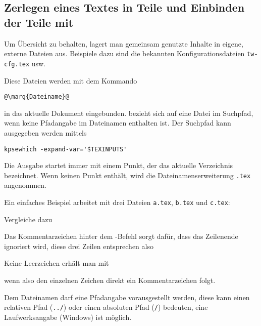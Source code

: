 \subsection[Zerlegen und Einbinden von Textteilen]{Zerlegen eines Textes in
  Teile und Einbinden der Teile mit }

Um Übersicht zu behalten, lagert man gemeinsam genutzte Inhalte in
eigene, externe Dateien aus. Beispiele dazu sind die bekannten
Konfigurationsdateien \texttt{tw-cfg.tex} usw.

Diese Dateien werden mit dem Kommando
\begin{lstlisting}
@\marg{Dateiname}@
\end{lstlisting}
in das aktuelle Dokument eingebunden.  bezieht sich
auf eine Datei im Suchpfad, wenn keine Pfadangabe im Dateinamen
enthalten ist. Der Suchpfad kann ausgegeben werden mittels
\begin{lstlisting}
kpsewhich -expand-var='$TEXINPUTS'
\end{lstlisting}
Die Ausgabe startet immer mit einem Punkt, der das aktuelle Verzeichnis
bezeichnet. Wenn  keinen Punkt enthält, wird die
Dateinamenserweiterung \texttt{.tex} angenommen.

Ein einfaches Beispiel arbeitet mit drei Dateien \texttt{a.tex},
\texttt{b.tex} und \texttt{c.tex}:





Vergleiche dazu

%
%


Das Kommentarzeichen hinter dem -Befehl sorgt dafür, dass
das Zeilenende ignoriert wird, diese drei Zeilen entsprechen also



Keine Leerzeichen erhält man mit



wenn also den einzelnen Zeichen direkt ein Kommentarzeichen folgt.

Dem Dateinamen darf eine Pfadangabe vorausgestellt werden, diese
kann einen relativen Pfad (\texttt{../}) oder einen absoluten Pfad
(\texttt{/}) bedeuten, eine Laufwerksangabe (Windows) ist möglich.


